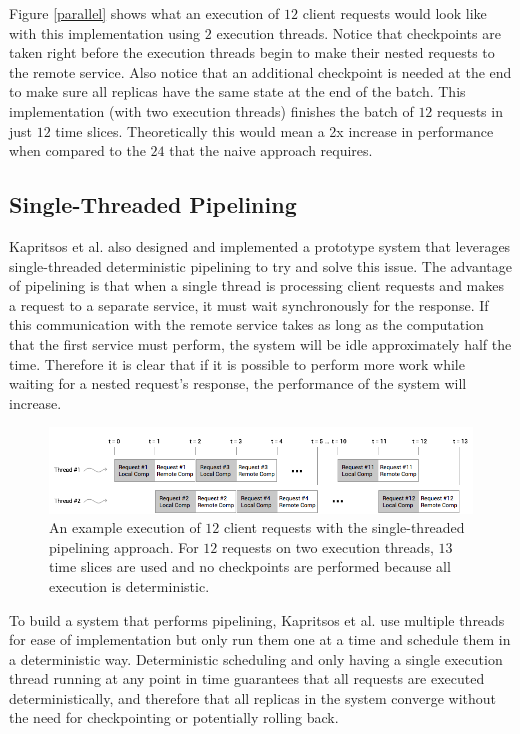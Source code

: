 \documentclass[11pt, oneside]{report}
\begin{document}
Figure \ref{parallel} shows what an execution of $12$ client requests would look like with this implementation using $2$ execution threads. 
Notice that checkpoints are taken right before the execution threads begin to make their nested requests to the remote service. 
Also notice that an additional checkpoint is needed at the end to make sure all replicas have the same state at the end of the batch.
This implementation (with two execution threads) finishes the batch of $12$ requests in just $12$ time slices.
Theoretically this would mean a 2x increase in performance when compared to the $24$ that the naive approach requires.

\subsection{Single-Threaded Pipelining}\label{STP}

Kapritsos et al. also designed and implemented a prototype system that leverages single-threaded deterministic pipelining to try and solve this issue. 
The advantage of pipelining is that when a single thread is processing client requests and makes a request to a separate service, it must wait synchronously for the response. 
If this communication with the remote service takes as long as the computation that the first service must perform, the system will be idle approximately half the time.
Therefore it is clear that if it is possible to perform more work while waiting for a nested request's response, the performance of the system will increase.

\begin{figure}[h]
\centering
\includegraphics[width=1.0\textwidth]{SequentialPipelined.png}
\caption{\label{seqpipe}An example execution of $12$ client requests with the single-threaded pipelining approach. For $12$ requests on two execution threads, $13$ time slices are used and no checkpoints are performed because all execution is deterministic.}
\end{figure}

To build a system that performs pipelining, Kapritsos et al. use multiple threads for ease of implementation but only run them one at a time and schedule them in a deterministic way. 
Deterministic scheduling and only having a single execution thread running at any point in time guarantees that all requests are executed deterministically, and therefore that all replicas in the system converge without the need for checkpointing or potentially rolling back.
\end{document}

